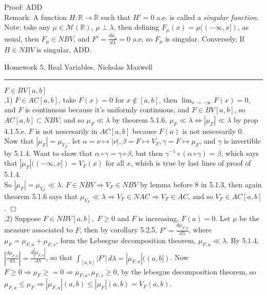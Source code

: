 \documentclass[12pt]{article}
\newcommand{\rimply}[0] { \Rightarrow }
\newcommand{\lrimply}[0] { \Leftrightarrow }
\newcommand{\rarw}[0] { \rightarrow }
\newcommand{\reals}[0] { \mathbb{R}}
\newcommand{\M}[0] { \mathcal{M} }
\begin{document}
\noindent
Proof: ADD \\

Remark: A function $H: \reals \rarw \reals$ such that $H'=0$ a.e. is called a \emph{singular function}. Note: take any $\mu \in \M(\reals)$, $\mu \perp \lambda$, then defining $F_\mu(x) = \mu((-\infty,x])$, as usual, then $F_\mu \in NBV$, and $F' = \frac{d\mu_a}{d\lambda} = 0$ a.e. so $F_\mu$ is singular. Conversely, If $H \in NBV$ is singular,  ADD.


\break


\begin{flushleft}
Homework 5, Real Variables, Nicholas Maxwell\\
\end{flushleft}

\begin{flushleft}
\addvspace{5pt} \hrule
\end{flushleft}	


$F \in BV[a,b]$ \\

,1) $F \in AC[a,b]$, take $F(x) = 0$ for $x \not \in [a,b]$, then $\lim_{x \rarw - \infty} F(x) = 0$, and $F$ is continuous because it's uniformly continuous, and $F \in BV[a,b]$, so $AC[a,b] \subset NBV$, and so $\mu_F \ll \lambda$ by theorem 5.1.6. $\mu_F \ll \lambda \lrimply |\mu_F| \ll \lambda$ by prop 4.1.5.e. $F$ is not nescesarily in $AC[a,b]$ because $F(a)$ is not nescesarily 0. \\

\noindent
Now that $|\mu_F| = \mu_{V_F}$. let $\alpha = \nu \mapsto |\nu|, \beta = F \mapsto V_F, \gamma = F \mapsto \mu_F$, and $\gamma$ is invertible by 5.1.4. Want to show that $\alpha \circ \gamma = \gamma \circ \beta$, but then $ \gamma^{-1} \circ ( \alpha \circ \gamma) = \beta$, which says that $|\mu_F|((-\infty,x]) = V_F(x)$ for all $x$, which is true by last lines of proof of 5.1.4.\\


So $|\mu_F| = \mu_{V_F} \ll \lambda$. $F \in NBV \rimply V_F \in NBV$  by lemma before 8 in 5.1.3, then again theorem 5.1.6 says that $\mu_{V_F} \ll \lambda \rimply  V_F \in NAC \rimply V_F \in AC$, and so $V_F \in AC[a,b]$. $\Box$ \\

,2) Suppose $F \in NBV[a,b],$ $F \ge 0$ and $F$ is increasing, $F(a)=0$. Let $\mu$ be the measure associated to $F$, then by corollary 5.2.5, $F' = \frac{d \mu_{F,a}}{d \lambda}$, where $\mu_{F} = \mu_{F,a} + \mu_{F,s}$, form the Lebesgue decomposition theorem, $\mu_{F,a} \ll \lambda$. By 5.1.4, $|\frac{d \mu_{F,a}}{d \lambda}| = \frac{d |\mu_{F,a}|}{d \lambda}$, so that $\int_{[a,b]} |F'| \, d\lambda = |\mu_{F,a}|((a,b])$. Now $F \ge 0 \rimply \mu_F \ge = 0 \rimply \mu_{F,a},\mu_{F,s} \ge 0$, by the lebesgue decomposition theorem, so $\mu_{F,a} \le \mu_F \rimply |\mu_{F,a}|(a,b) \le |\mu_F |(a,b)  = V_F(a,b)$. \\
\end{document}
